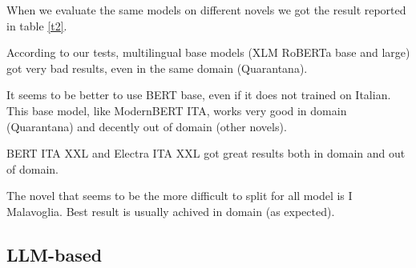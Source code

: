 \documentclass[11pt]{article}
\begin{document}
When we evaluate the same models on different novels we got the
result reported in table \ref{t2}.

According to our tests, multilingual base models (XLM RoBERTa base and large)
got very bad results, even in the same domain (Quarantana).

It seems to be better to use BERT base, even if it does not trained on Italian.
This base model, like ModernBERT ITA, works very good in domain (Quarantana) and
decently out of domain (other novels).

BERT ITA XXL and Electra ITA XXL got great results both in domain and out of domain.

The novel that seems to be the more difficult to split for all model is I Malavoglia.
Best result is usually achived in domain (as expected).

\subsection{LLM-based}


\end{document}
